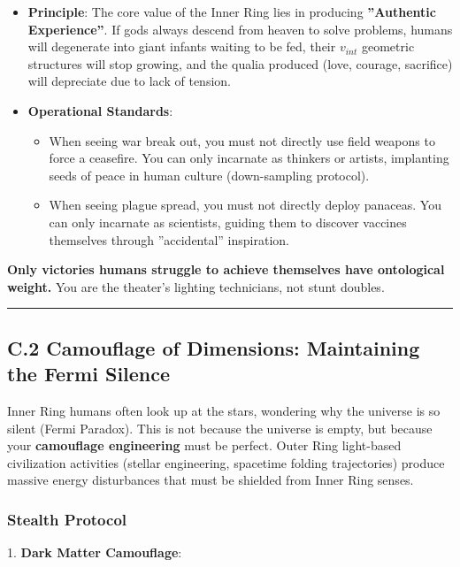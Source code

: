 \begin{itemize}
\item \textbf{Principle}: The core value of the Inner Ring lies in producing \textbf{''Authentic Experience''}. If gods always descend from heaven to solve problems, humans will degenerate into giant infants waiting to be fed, their $v_{int}$ geometric structures will stop growing, and the qualia produced (love, courage, sacrifice) will depreciate due to lack of tension.

\item \textbf{Operational Standards}:

    \begin{itemize}
    \item When seeing war break out, you must not directly use field weapons to force a ceasefire. You can only incarnate as thinkers or artists, implanting seeds of peace in human culture (down-sampling protocol).

    \item When seeing plague spread, you must not directly deploy panaceas. You can only incarnate as scientists, guiding them to discover vaccines themselves through ''accidental'' inspiration.
    \end{itemize}
\end{itemize}

\textbf{Only victories humans struggle to achieve themselves have ontological weight.} You are the theater's lighting technicians, not stunt doubles.

\hrule

\subsection{C.2 Camouflage of Dimensions: Maintaining the Fermi Silence}

Inner Ring humans often look up at the stars, wondering why the universe is so silent (Fermi Paradox). This is not because the universe is empty, but because your \textbf{camouflage engineering} must be perfect. Outer Ring light-based civilization activities (stellar engineering, spacetime folding trajectories) produce massive energy disturbances that must be shielded from Inner Ring senses.

\subsubsection{Stealth Protocol}

1.  \textbf{Dark Matter Camouflage}:

